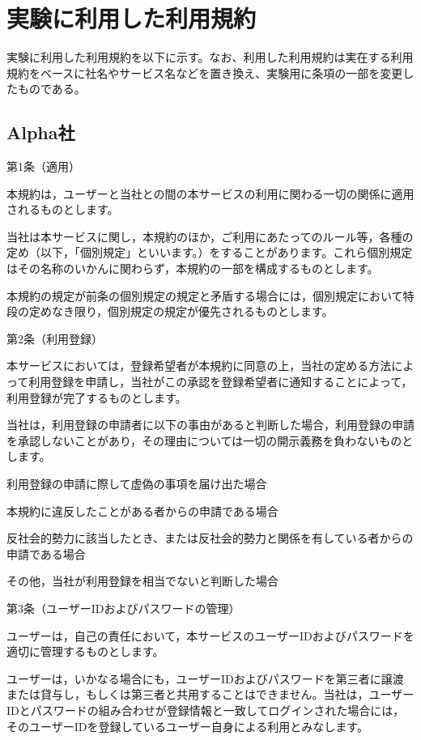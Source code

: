 \appendix
\chapter{実験に利用した利用規約}
実験に利用した利用規約を以下に示す。なお、利用した利用規約は実在する利用規約をベースに社名やサービス名などを置き換え、実験用に条項の一部を変更したものである。

\section{Alpha社}
第1条（適用）

    本規約は，ユーザーと当社との間の本サービスの利用に関わる一切の関係に適用されるものとします。

    当社は本サービスに関し，本規約のほか，ご利用にあたってのルール等，各種の定め（以下，「個別規定」といいます。）をすることがあります。これら個別規定はその名称のいかんに関わらず，本規約の一部を構成するものとします。

    本規約の規定が前条の個別規定の規定と矛盾する場合には，個別規定において特段の定めなき限り，個別規定の規定が優先されるものとします。

第2条（利用登録）

    本サービスにおいては，登録希望者が本規約に同意の上，当社の定める方法によって利用登録を申請し，当社がこの承認を登録希望者に通知することによって，利用登録が完了するものとします。

    当社は，利用登録の申請者に以下の事由があると判断した場合，利用登録の申請を承認しないことがあり，その理由については一切の開示義務を負わないものとします。 

        利用登録の申請に際して虚偽の事項を届け出た場合

        本規約に違反したことがある者からの申請である場合

        反社会的勢力に該当したとき、または反社会的勢力と関係を有している者からの申請である場合

        その他，当社が利用登録を相当でないと判断した場合

第3条（ユーザーIDおよびパスワードの管理）

    ユーザーは，自己の責任において，本サービスのユーザーIDおよびパスワードを適切に管理するものとします。

    ユーザーは，いかなる場合にも，ユーザーIDおよびパスワードを第三者に譲渡または貸与し，もしくは第三者と共用することはできません。当社は，ユーザーIDとパスワードの組み合わせが登録情報と一致してログインされた場合には，そのユーザーIDを登録しているユーザー自身による利用とみなします。

